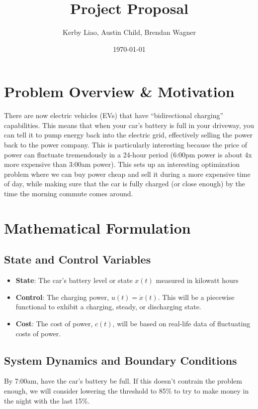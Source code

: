 \documentclass[11pt, letterpaper]{article}
\title{\textbf{Project Proposal}}
\author{Kerby Liao, Austin Child, Brendan Wagner}
\date{\today}
\begin{document}
\maketitle

\section{Problem Overview \& Motivation}
There are now electric vehicles (EVs) that have ``bidirectional charging'' capabilities. This means that when your car's battery is full in your driveway, you can tell it to pump energy back into the electric grid, effectively selling the power back to the power company. This is particularly interesting because the price of power can fluctuate tremendously in a 24-hour period (6:00pm power is about 4x more expensive than 3:00am power). This sets up an interesting optimization problem where we can buy power cheap and sell it during a more expensive time of day, while making sure that the car is fully charged (or close enough) by the time the morning commute comes around.

\section{Mathematical Formulation}

\subsection{State and Control Variables}
\begin{itemize}

    \item \textbf{State}: The car's battery level or state $x(t)$ measured in kilowatt hours
    \item \textbf{Control}: The charging power, $u(t) = \dot{x}(t)$. This will be a piecewise functional to exhibit a charging, steady, or discharging state.
    \item \textbf{Cost}: The cost of power, $c(t)$, will be based on real-life data of fluctuating costs of power.
\end{itemize}

\subsection{System Dynamics and Boundary Conditions}
    By 7:00am, have the car's battery be full. If this doesn't contrain the problem enough, we will consider lowering the threshold to 85\% to try to make money in the night with the last 15\%.
\end{document}
